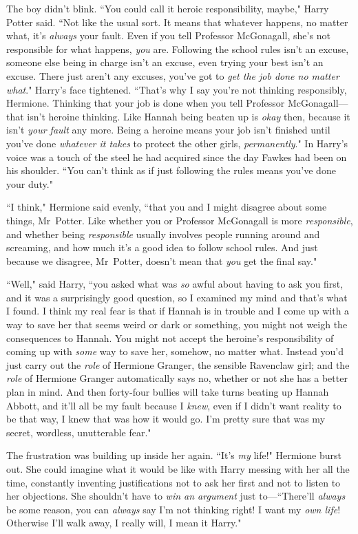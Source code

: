 The boy didn't blink. ``You could call it heroic responsibility, maybe," Harry Potter said. ``Not like the usual sort. It means that whatever happens, no matter what, it's \emph{always} your fault. Even if you tell Professor McGonagall, she's not responsible for what happens, \emph{you} are. Following the school rules isn't an excuse, someone else being in charge isn't an excuse, even trying your best isn't an excuse. There just aren't any excuses, you've got to \emph{get the job done no matter what}." Harry's face tightened. ``That's why I say you're not thinking responsibly, Hermione. Thinking that your job is done when you tell Professor McGonagall—that isn't heroine thinking. Like Hannah being beaten up is \emph{okay} then, because it isn't \emph{your fault} any more. Being a heroine means your job isn't finished until you've done \emph{whatever it takes} to protect the other girls, \emph{permanently}." In Harry's voice was a touch of the steel he had acquired since the day Fawkes had been on his shoulder. ``You can't think as if just following the rules means you've done your duty."

``I think," Hermione said evenly, ``that you and I might disagree about some things, Mr~Potter. Like whether you or Professor McGonagall is more \emph{responsible}, and whether being \emph{responsible} usually involves people running around and screaming, and how much it's a good idea to follow school rules. And just because we disagree, Mr~Potter, doesn't mean that \emph{you} get the final say."

``Well," said Harry, ``you asked what was \emph{so} awful about having to ask you first, and it was a surprisingly good question, so I examined my mind and that's what I found. I think my real fear is that if Hannah is in trouble and I come up with a way to save her that seems weird or dark or something, you might not weigh the consequences to Hannah. You might not accept the heroine's responsibility of coming up with \emph{some} way to save her, somehow, no matter what. Instead you'd just carry out the \emph{role} of Hermione Granger, the sensible Ravenclaw girl; and the \emph{role} of Hermione Granger automatically says no, whether or not she has a better plan in mind. And then forty-four bullies will take turns beating up Hannah Abbott, and it'll all be my fault because I \emph{knew}, even if I didn't want reality to be that way, I knew that was how it would go. I'm pretty sure that was my secret, wordless, unutterable fear."

The frustration was building up inside her again. ``It's \emph{my} life!" Hermione burst out. She could imagine what it would be like with Harry messing with her all the time, constantly inventing justifications not to ask her first and not to listen to her objections. She shouldn't have to \emph{win an argument} just to—``There'll \emph{always} be some reason, you can \emph{always} say I'm not thinking right! I want my \emph{own life}! Otherwise I'll walk away, I really will, I mean it Harry."

